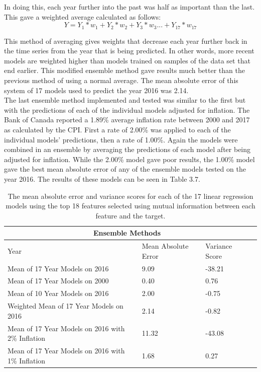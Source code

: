 \documentclass[12pt]{dalthesis}
\begin{document}
In doing this,  each year further into the past was half as important than the last. This gave a weighted average calculated as follows:
\[ Y = Y_1 *w_1 + Y_2 * w_2 +Y_3 *w_3 ... + Y_{17}* w_{17} \]

This method of averaging gives weights that decrease each year further back in the time series from the year that is being predicted. In other words, more recent models are weighted higher than models trained on samples of the data set that end earlier. This modified ensemble method gave results much better than the previous method of using a normal average. The mean absolute error of this system of 17 models used to predict the year 2016 was 2.14. \\

The last ensemble method implemented and tested was similar to the first but with the predictions of each of the individual models adjusted for inflation. The Bank of Canada reported a 1.89\% average inflation rate between 2000 and 2017 as calculated by the CPI. First a rate of 2.00\% was applied to each of the individual models' predictions, then a rate of 1.00\%. Again the models were combined in an ensemble by averaging the predictions of each model after being adjusted for inflation. While the 2.00\% model gave poor results, the 1.00\% model gave the best mean absolute error of any of the ensemble models tested on the year 2016. The results of these models can be seen in Table 3.7.\\

\begin{table}
	\caption{The mean absolute error and variance scores for each of the 17 linear regression models using the top 18 features selected using mutual information between each feature and the target. }
	\label{tab:example_table}
    \begin{tabular}{ |p{5cm}||p{4cm}|p{4cm}|p{4cm}|  }
       \hline
       \multicolumn{3}{|c|}{Ensemble Methods } \\
       \hline
       Year    & Mean Absolute Error    & Variance Score \\
       \hline
       Mean of 17 Year Models on 2016    & 9.09    & -38.21\\
       Mean of 17 Year Models on 2000    & 0.40    & 0.76\\
       Mean of 10 Year Models on 2016    & 2.00    & -0.75\\
       Weighted Mean of 17 Year Models on 2016   & 2.14    & -0.82\\
       Mean of 17 Year Models on 2016 with 2\% Inflation    &11.32    & -43.08\\
       Mean of 17 Year Models on 2016 with 1\% Inflation   & 1.68    & 0.27\\
       \hline
    \end{tabular}
\end{table}
\end{document}
